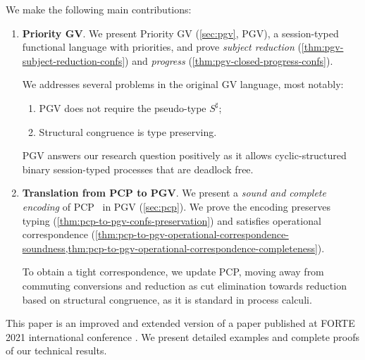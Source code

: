 We make the following main contributions:
\begin{enumerate}
\item \textbf{Priority GV}. We present Priority GV (\cref{sec:pgv}, PGV), a session-typed functional language with priorities, and prove \emph{subject reduction} (\cref{thm:pgv-subject-reduction-confs}) and \emph{progress} (\cref{thm:pgv-closed-progress-confs}).

We addresses several problems in the original GV language, most notably:
  \begin{enumerate}
  \item PGV does not require the pseudo-type $S^\sharp$;
  \item Structural congruence is type preserving.
  \end{enumerate}
  PGV answers our research question positively as it allows cyclic-structured binary session-typed processes that are deadlock free.
\item \textbf{Translation from PCP to PGV}.
  We present a \emph{sound and complete encoding} of PCP~\cite{dardhagay18extended} in PGV (\cref{sec:pcp}). We prove the encoding preserves typing (\cref{thm:pcp-to-pgv-confs-preservation}) and satisfies operational correspondence (\cref{thm:pcp-to-pgv-operational-correspondence-soundness,thm:pcp-to-pgv-operational-correspondence-completeness}).

  To obtain a tight correspondence, we update PCP, moving away from commuting conversions and reduction as cut elimination towards reduction based on structural congruence, as it is standard in process calculi.
\end{enumerate}

This paper is an improved and extended version of a paper published at FORTE 2021 international conference \cite{kokkedardha21pgv}. We present detailed examples and complete proofs of our technical results.
